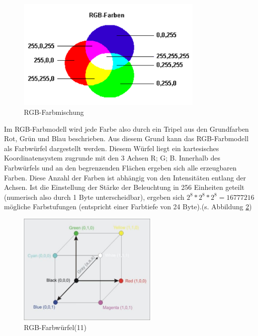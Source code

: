 \begin{figure}[h]
	\centering
		\includegraphics[width=0.8\textwidth]{img/rgb_farbmischung_steph.png}
	\caption[RGB-Farbmischung]{RGB-Farbmischung}
	\label{fig:farbmischung_steph}
\end{figure}


Im RGB-Farbmodell wird jede Farbe also durch ein Tripel aus den Grundfarben Rot, Grün und Blau beschrieben. Aus diesem Grund kann das RGB-Farbmodell als Farbwürfel dargestellt werden. Diesem Würfel liegt ein kartesisches Koordinatensystem zugrunde mit den 3 Achsen R; G; B. Innerhalb des Farbwürfels und an den begrenzenden Flächen ergeben sich alle erzeugbaren Farben. Diese Anzahl der Farben ist abhängig von den Intensitäten entlang der Achsen. Ist die Einstellung der Stärke der Beleuchtung in 256 Einheiten geteilt (numerisch also durch 1 Byte unterscheidbar), ergeben sich ${2}^8 * {2}^8 * {2}^8 = 16777216 $ mögliche Farbstufungen (entspricht einer Farbtiefe von 24 Byte).(s. Abbildung \ref{fig:farbwurfel_steph})

\begin{figure}[h]
	\centering
		\includegraphics[width=0.6\textwidth]{img/rgb_farbwuerfel_steph.jpg}
	\caption[RGB-Farbwürfel(11)]{RGB-Farbwürfel(11)}
	\label{fig:farbwurfel_steph}
\end{figure}

